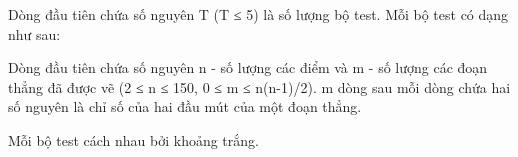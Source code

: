 Dòng đầu tiên chứa số nguyên T (T ≤ 5) là số lượng bộ test. Mỗi bộ test có dạng như sau:  

   Dòng đầu tiên chứa số nguyên n - số lượng các điểm và m - số lượng các đoạn thẳng đã được vẽ (2 ≤ n ≤ 150, 0 ≤ m ≤ n(n-1)/2). m dòng sau mỗi dòng chứa hai số nguyên là chỉ số của hai đầu mút của một đoạn thẳng.  

   Mỗi bộ test cách nhau bởi khoảng trắng.
